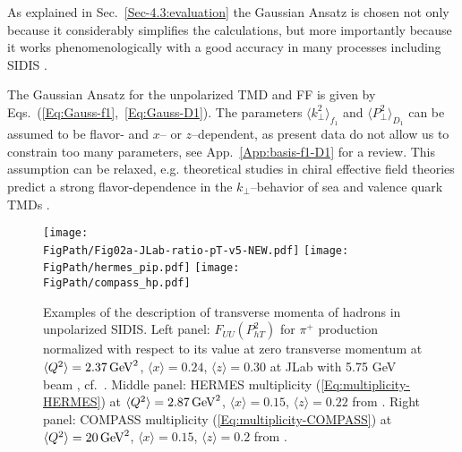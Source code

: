 \documentclass[a4paper,11pt]{article}
\newcommand{\la}{\langle}
\newcommand{\ra}{\rangle}
\def\kperp{k_\perp}
\def\pperp{P_\perp}
\def\avkperp{\la \kperp^2 \ra}
\def\avpperp{\la \pperp^2 \ra}
\newcommand*{\FigPath}{./figs}%
\begin{document}
As explained in Sec.~\ref{Sec-4.3:evaluation} the Gaussian Ansatz is chosen
not only because it considerably simplifies the calculations, but more 
importantly because it works phenomenologically with a good accuracy 
in many processes including SIDIS
\cite{Anselmino:2005nn,Collins:2005ie,D'Alesio:2007jt,Schweitzer:2010tt,
Signori:2013mda,Anselmino:2013lza}.

The Gaussian Ansatz for the unpolarized TMD and FF 
is given by Eqs.~(\ref{Eq:Gauss-f1},~\ref{Eq:Gauss-D1}).
The parameters $\avkperp_{f_1}$ and $\avpperp_{D_1}$ can
be assumed to be flavor- and $x$-- or $z$--dependent, as present
data do not allow us to constrain too many parameters, see
App.~\ref{App:basis-f1-D1} for a review. This assumption can be
relaxed, e.g. theoretical studies in chiral effective field theories 
predict a strong flavor-dependence in the $\kperp$--behavior
of sea and valence quark TMDs \cite{Schweitzer:2012hh}.

\begin{figure}[b!]
\centering
\texttt{[image: \\FigPath/Fig02a-JLab-ratio-pT-v5-NEW.pdf]}  \quad
\texttt{[image: \\FigPath/hermes\_pip.pdf]} \quad
\texttt{[image: \\FigPath/compass\_hp.pdf]} 
\caption{\label{FUU-show-pT-dependence}
Examples of the 
	description of transverse momenta of hadrons in unpolarized SIDIS. 
Left panel: 
	$F_{UU}(P_{hT}^2)$ for $\pi^+$ production normalized with 
	respect to its value at zero transverse momentum at 
	$\la Q^2\ra=2.37\,{\rm GeV}^2$, $\la x\ra=0.24$, $\la z\ra=0.30$ 
	at JLab with 5.75 GeV beam \cite{Osipenko:2008aa}, cf.\  
	\cite{Schweitzer:2010tt}.
Middle panel: 
	HERMES multiplicity (\ref{Eq:multiplicity-HERMES}) at 
	$\la Q^2\ra=2.87\,{\rm GeV}^2$, $\la x\ra  =0.15$, $\la z\ra  =0.22$
	from \cite{Airapetian:2012ki}.
Right panel: 
	COMPASS multiplicity (\ref{Eq:multiplicity-COMPASS}) at 
	$\la Q^2\ra=20\,{\rm GeV}^2$, $\la x\ra  =0.15$, $\la z\ra  =0.2$
	from \cite{Aghasyan:2017ctw}.}
\end{figure}
\end{document}
